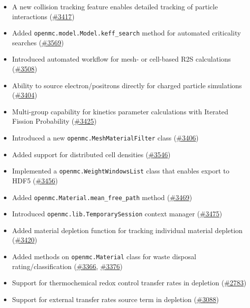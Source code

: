 \begin{itemize}
\item A new collision tracking feature enables detailed tracking of particle interactions (\href{https://github.com/openmc-dev/openmc/pull/3417}{\#3417})
\item Added \texttt{openmc.model.Model.keff\_search} method for automated criticality searches (\href{https://github.com/openmc-dev/openmc/pull/3569}{\#3569})
\item Introduced automated workflow for mesh- or cell-based R2S calculations (\href{https://github.com/openmc-dev/openmc/pull/3508}{\#3508})
\item Ability to source electron/positrons directly for charged particle simulations (\href{https://github.com/openmc-dev/openmc/pull/3404}{\#3404})
\item Multi-group capability for kinetics parameter calculations with Iterated Fission Probability (\href{https://github.com/openmc-dev/openmc/pull/3425}{\#3425})
\item Introduced a new \texttt{openmc.MeshMaterialFilter} class (\href{https://github.com/openmc-dev/openmc/pull/3406}{\#3406})
\item Added support for distributed cell densities (\href{https://github.com/openmc-dev/openmc/pull/3546}{\#3546})
\item Implemented a \texttt{openmc.WeightWindowsList} class that enables export to HDF5 (\href{https://github.com/openmc-dev/openmc/pull/3456}{\#3456})
\item Added \texttt{openmc.Material.mean\_free\_path} method (\href{https://github.com/openmc-dev/openmc/pull/3469}{\#3469})
\item Introduced \texttt{openmc.lib.TemporarySession} context manager (\href{https://github.com/openmc-dev/openmc/pull/3475}{\#3475})
\item Added material depletion function for tracking individual material depletion (\href{https://github.com/openmc-dev/openmc/pull/3420}{\#3420})
\item Added methods on \texttt{openmc.Material} class for waste disposal rating/classification (\href{https://github.com/openmc-dev/openmc/pull/3366}{\#3366}, \href{https://github.com/openmc-dev/openmc/pull/3376}{\#3376})
\item Support for thermochemical redox control transfer rates in depletion (\href{https://github.com/openmc-dev/openmc/pull/2783}{\#2783})
\item Support for external transfer rates source term in depletion (\href{https://github.com/openmc-dev/openmc/pull/3088}{\#3088})

\end{itemize}
